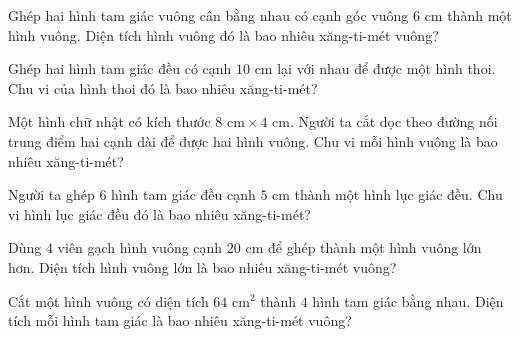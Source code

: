 
\begin{ex}
  Ghép hai hình tam giác vuông cân bằng nhau có cạnh góc vuông $6\text{ cm}$ thành một hình vuông. Diện tích hình vuông đó là bao nhiêu xăng-ti-mét vuông?
\end{ex}

\begin{ex}
  Ghép hai hình tam giác đều có cạnh $10\text{ cm}$ lại với nhau để được một hình thoi. Chu vi của hình thoi đó là bao nhiêu xăng-ti-mét?
\end{ex}

\begin{ex}
  Một hình chữ nhật có kích thước $8\text{ cm} \times 4\text{ cm}$. Người ta cắt dọc theo đường nối trung điểm hai cạnh dài để được hai hình vuông. Chu vi mỗi hình vuông là bao nhiêu xăng-ti-mét?
\end{ex}

\begin{ex}
  Người ta ghép $6$ hình tam giác đều cạnh $5\text{ cm}$ thành một hình lục giác đều. Chu vi hình lục giác đều đó là bao nhiêu xăng-ti-mét?
\end{ex}

\begin{ex}
  Dùng $4$ viên gạch hình vuông cạnh $20\text{ cm}$ để ghép thành một hình vuông lớn hơn. Diện tích hình vuông lớn là bao nhiêu xăng-ti-mét vuông?
\end{ex}

\begin{ex}
  Cắt một hình vuông có diện tích $64\text{ cm}^2$ thành $4$ hình tam giác bằng nhau. Diện tích mỗi hình tam giác là bao nhiêu xăng-ti-mét vuông?
\end{ex}


